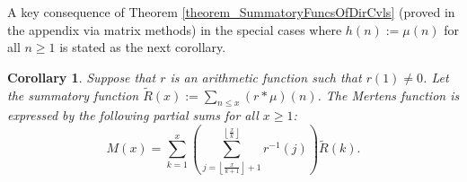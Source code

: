 \documentclass[11pt,reqno,a4letter]{article}
\newcommand{\hlocalref}[1]{\hyperref[#1]{\ref{#1}}}
\numberwithin{equation}{section}
\numberwithin{figure}{section}
\numberwithin{table}{section}
\newcommand{\floor}[1]{\left\lfloor #1 \right\rfloor}
\theoremstyle{plain}
\newtheorem{cor}[theorem]{Corollary}
\numberwithin{theorem}{section}
\theoremstyle{definition}
\begin{document}
A key consequence of Theorem \hlocalref{theorem_SummatoryFuncsOfDirCvls} 
(proved in the appendix via matrix methods) 
in the special cases where $h(n) := \mu(n)$ for all $n \geq 1$ 
is stated as the next corollary. 

\begin{cor} 
\label{cor_CvlGAstMu} 
Suppose that $r$ is an arithmetic function such that 
$r(1) \neq 0$. Let the summatory function 
$\widetilde{R}(x) := \sum_{n \leq x} (r \ast \mu)(n)$. 
The Mertens function is expressed by the following 
partial sums for all $x \geq 1$: 
\[
M(x) = \sum_{k=1}^{x} \left(\sum_{j=\floor{\frac{x}{k+1}}+1}^{\floor{\frac{x}{k}}} r^{-1}(j)\right) 
     \widetilde{R}(k). 
\]
\end{cor} 

\begin{figure}[ht!]

\captionsetup{singlelinecheck=off}
\centering

\begin{subfigure}[t]{0.9\textwidth}
\end{subfigure}

\captionsetup{justification=centering}
\caption{} 
\label{figure_MxAndNewAuxPartialSums_Comparison_Intro_v2_v1} 

\end{figure} 
\end{document}
